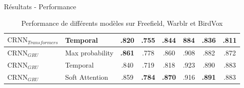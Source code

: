 \documentclass[compress,xcolor=table]{beamer}
\begin{document}
\begin{frame}{Résultats - Performance}
\begin{table}[h]
{\begin{tabular}{llcccccc}
                $\textrm{CRNN}_{\textit{Transformers}}$ & Temporal                 & .820                              & .755                           & .844                        & 884           & .836          & .811          \\
                \midrule
                $\textrm{CRNN}_{GRU}$                   & Max probability          & \textbf{.861}                     & .778                           & .860                        & .908          & .882          & .872          \\
                $\textrm{CRNN}_{GRU}$                   & Temporal                 & .840                              & .719                           & .818                        & .923          & .890          & .883          \\
                $\textrm{CRNN}_{GRU}$                   & Soft Attention           & .859                              & \textbf{.784}                  & \textbf{.870}               & .916          & \textbf{.891} & .883          \\
                \bottomrule
            \end{tabular}
        }
        \caption{Performance de différents modèles sur Freefield, Warblr et BirdVox}
        \label{tab:performance}
    \end{table}

\end{frame}
\end{document}
